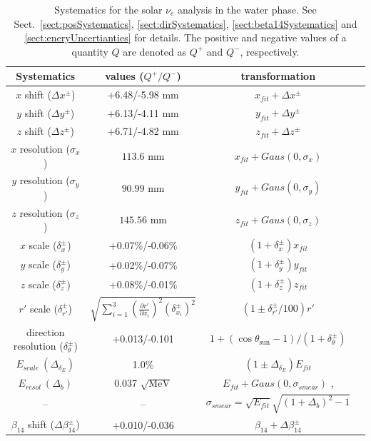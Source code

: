 {\begin{table}[ht]
	\centering
\caption{Systematics for the solar $\nu_e$ analysis in the water phase. See Sect.~\ref{sect:posSystematics}, \ref{sect:dirSystematics}, \ref{sect:beta14Systematics} and \ref{sect:eneryUncertianties} for details. The positive and negative values of a quantity $Q$ are denoted as $Q^+$ and $Q^-$, respectively.\label{tab:solar_uncertainties}}
	\vspace{2mm}
	\begin{tabular*}{148mm}{c@{\extracolsep{\fill}}ccc}
		\toprule
		Systematics & values ($Q^+/Q^-$) & transformation   \\
		\hline
		$x$ shift ($\Delta x^\pm$) & +6.48/-5.98 mm  & $x_{fit}+\Delta x^\pm$ \\	
		$y$ shift ($\Delta y^\pm$)& +6.13/-4.11 mm   & $y_{fit}+\Delta y^\pm$ \\
		$z$ shift ($\Delta z^\pm$)& +6.71/-4.82 mm   & $z_{fit}+\Delta z^\pm$ \\
		$x$ resolution ($\sigma_{x}$) & $113.6$ mm& $x_{fit}+Gaus(0,\sigma_{x})$\\	
		$y$ resolution ($\sigma_{y}$) & $90.99$ mm& $y_{fit}+Gaus(0,\sigma_{y})$\\
		$z$ resolution ($\sigma_{z}$) & $145.56$ mm& $z_{fit}+Gaus(0,\sigma_{z})$\\
		$x$ scale ($\delta_x^{\pm}$)& +0.07\%/-0.06\%  & $(1+\delta_x^{\pm})x_{fit}$\\	
		$y$ scale ($\delta_y^{\pm}$)& +0.02\%/-0.07\%  & $(1+\delta_y^{\pm})y_{fit}$ \\
		$z$ scale ($\delta_z^{\pm}$)& +0.08\%/-0.01\%  & $(1+\delta_z^{\pm})z_{fit}$ \\
		$r'$ scale ($\delta_{r'}^{\pm}$)&  $\sqrt{\sum_{i=1}^3(\frac{\partial r'}{\partial x_i})^2({\delta^{\pm}_{x_i}})^2}$    & $(1\pm\delta^{\pm}_{r'}/100)r'$\\
		direction resolution ($\delta_\theta^{\pm}$)  & +0.013/-0.101 & $1+(\cos\theta_\mathrm{sun}-1)/(1+\delta_\theta^{\pm})$\\
		$E_{scale}~(\Delta_{\delta_E})$ &  1.0\%  & $(1\pm \Delta_{\delta_E})E_{fit}$\\
		$E_{resol}~(\Delta_b)$ &  0.037 $\sqrt{\mathrm{MeV}}$  & $E_{fit}+Gaus(0,\sigma_{smear})$ , \\
		-- & -- &$\sigma_{smear}=\sqrt{E_{fit}}\sqrt{(1+\Delta_b)^2-1}$\\
		$\beta_{14}$ shift ($\Delta \beta_{14}^\pm$) & +0.010/-0.036 & $\beta_{14}+\Delta \beta_{14}^\pm$\\
		\bottomrule
	\end{tabular*}
\end{table}

}
